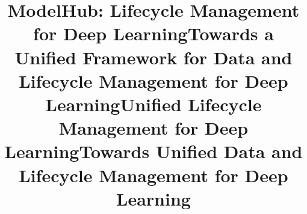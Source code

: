 \documentclass[conference]{IEEEtran}
\begin{document}

\title{{\ttlit ModelHub}: Lifecycle Management for Deep Learning}
\title{Towards a Unified Framework for Data and Lifecycle Management for Deep Learning}
\title{Unified Lifecycle Management for Deep Learning}
\title{Towards Unified Data and Lifecycle Management for Deep Learning}


\end{document}
